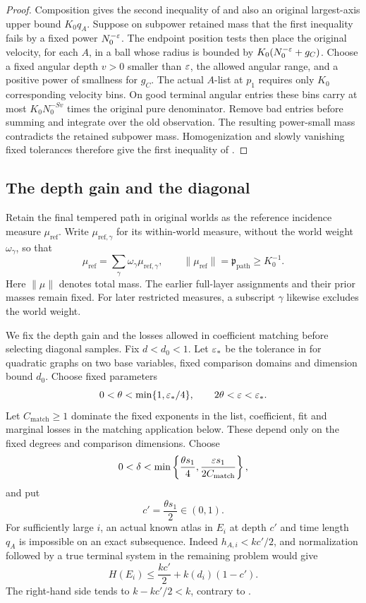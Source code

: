 \begin{proof}
Composition gives the second inequality of
 and also an original largest-axis upper
bound \(K_0q_A\).  Suppose on subpower retained mass that the first
inequality fails by a fixed power \(N_0^{-\varepsilon}\).
The endpoint position tests then place the original velocity, for
each \(A\), in a ball whose radius is bounded by
\(K_0(N_0^{-\varepsilon}+g_C)\).
Choose a fixed angular depth \(v>0\) smaller than \(\varepsilon\), the allowed
angular range, and a positive power of smallness for \(g_C\).
The actual \(A\)-list at \(p_1\) requires only \(K_0\) corresponding
velocity bins.  On good terminal angular entries these bins carry
at most \(K_0N_0^{-Sv}\) times the original pure denominator.
Remove bad entries before summing and integrate over the old
observation.  The resulting power-small mass contradicts the
retained subpower mass.  Homogenization and slowly vanishing fixed
tolerances therefore give the first inequality of
.
\end{proof}

\subsection{The depth gain and the diagonal}

Retain the final tempered path in original worlds as the reference
incidence measure \(\mu_{\mathrm{ref}}\).  Write
\(\mu_{\mathrm{ref},\gamma}\) for its within-world measure, without
the world weight \(\omega_\gamma\), so that
\[
 \mu_{\mathrm{ref}}
   =\sum_\gamma\omega_\gamma\mu_{\mathrm{ref},\gamma},
 \qquad
 \|\mu_{\mathrm{ref}}\|=\mathfrak p_{\mathrm{path}}\ge K_0^{-1}.
\]
Here \(\|\mu\|\) denotes total mass.  The earlier full-layer
assignments and their prior masses remain fixed.
For later restricted measures, a subscript \(\gamma\) likewise
excludes the world weight.

We fix the depth gain and the losses allowed in coefficient matching
before selecting diagonal samples. Fix \(d<d_0<1\). Let
\(\varepsilon_*\) be the tolerance in
 for quadratic graphs on two base
variables, fixed comparison domains and dimension bound \(d_0\).
Choose fixed parameters
\[
 0<\theta<\min\{1,\varepsilon_*/4\},\qquad
 2\theta<\varepsilon<\varepsilon_*.
\]
Let \(C_{\mathrm{match}}\ge1\) dominate the fixed exponents in
the list, coefficient, fit and marginal losses in the matching
application below.  These depend only on the fixed degrees and
comparison dimensions.  Choose
\[
 0<\delta<\min\left\{\frac{\theta s_1}{4},
                \frac{\varepsilon s_1}{2C_{\mathrm{match}}}\right\},
\]
and put
\begin{equation}
 \label{a08:gain}
 c'=\frac{\theta s_1}{2}\in(0,1).
\end{equation}
For sufficiently large \(i\), an actual known atlas in \(E_i\) at
depth \(c'\) and time length \(q_A\) is impossible on an exact
subsequence.  Indeed \(h_{A,i}<kc'/2\), and normalization followed by a
true terminal system in the remaining problem would give
\begin{equation}
 \label{a08:forbidden-horizon}
 H(E_i)\le \frac{kc'}2+k(d_i)(1-c').
\end{equation}
The right-hand side tends to \(k-kc'/2<k\), contrary to
.

